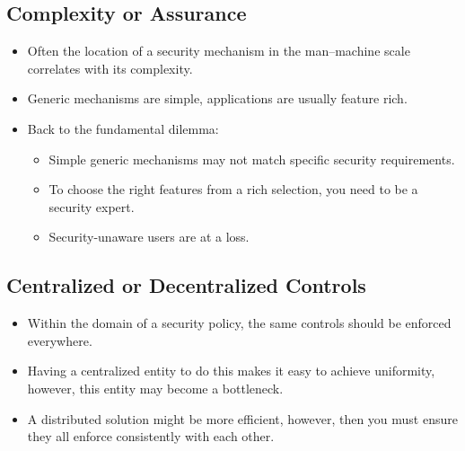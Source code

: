 \documentclass{beamer}
\begin{document}
\subsection{Complexity or Assurance}

\begin{frame}
  \begin{itemize}
    \item Often the location of a security mechanism in the man--machine scale 
      correlates with its complexity.

    \item Generic mechanisms are simple, applications are usually feature rich.

    \item Back to the fundamental dilemma:
      \begin{itemize}
        \item Simple generic mechanisms may not match specific security 
          requirements.

        \item To choose the right features from a rich selection, you need to 
          be a security expert.

        \item Security-unaware users are at a loss.
      \end{itemize}
  \end{itemize}
\end{frame}

\subsection{Centralized or Decentralized Controls}

\begin{frame}
  \begin{itemize}
    \item Within the domain of a security policy, the same controls should be 
      enforced everywhere.

    \item Having a centralized entity to do this makes it easy to achieve 
      uniformity, however, this entity may become a bottleneck.

    \item A distributed solution might be more efficient, however, then you 
      must ensure they all enforce consistently with each other.
  \end{itemize}
\end{frame}
\end{document}
